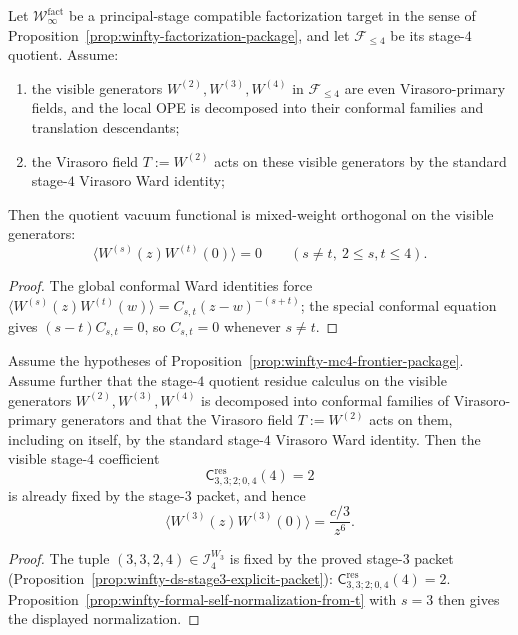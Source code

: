 \begin{proposition}
\label{prop:winfty-stage4-visible-orthogonality}
Let $\mathcal{W}^{\mathrm{fact}}_\infty$ be a principal-stage
compatible factorization target in the sense of
Proposition~\ref{prop:winfty-factorization-package}, and let
$\mathcal{F}_{\le 4}$ be its stage-$4$ quotient. Assume:
\begin{enumerate}[label=\textup{(\roman*)}]
\item the visible generators $W^{(2)},W^{(3)},W^{(4)}$ in
 $\mathcal{F}_{\le 4}$ are even Virasoro-primary fields, and the local
 OPE is decomposed into their conformal families and translation
 descendants;
\item the Virasoro field $T:=W^{(2)}$ acts on these visible generators
 by the standard stage-$4$ Virasoro Ward identity;
\end{enumerate}
Then the quotient vacuum functional is mixed-weight orthogonal on the
visible generators:
\[
\langle W^{(s)}(z)W^{(t)}(0)\rangle = 0
\qquad (s\neq t,\ 2\le s,t\le 4).
\]
\end{proposition}

\begin{proof}
The global conformal Ward identities force
$\langle W^{(s)}(z)W^{(t)}(w)\rangle = C_{s,t}(z-w)^{-(s+t)}$;
the special conformal equation gives $(s-t)C_{s,t}=0$,
so $C_{s,t}=0$ whenever $s\neq t$.
\end{proof}

\begin{proposition}
\label{prop:winfty-stage4-visible-w3-normalization}
Assume the hypotheses of
Proposition~\ref{prop:winfty-mc4-frontier-package}. Assume further
that the stage-$4$ quotient residue calculus on the visible generators
$W^{(2)},W^{(3)},W^{(4)}$ is decomposed into conformal families of
Virasoro-primary generators and that the Virasoro field $T:=W^{(2)}$
acts on them, including on itself, by the standard stage-$4$
Virasoro Ward identity. Then the visible stage-$4$ coefficient
\[
\mathsf{C}^{\mathrm{res}}_{3,3;2;0,4}(4)=2
\]
is already fixed by the stage-$3$ packet, and hence
\[
\langle W^{(3)}(z)W^{(3)}(0)\rangle=\frac{c/3}{z^{6}}.
\]
\end{proposition}

\begin{proof}
The tuple $(3,3,2,4)\in\mathcal{I}_4^{W_3}$ is fixed by the
proved stage-$3$ packet
(Proposition~\ref{prop:winfty-ds-stage3-explicit-packet}):
$\mathsf{C}^{\mathrm{res}}_{3,3;2;0,4}(4)=2$.
Proposition~\ref{prop:winfty-formal-self-normalization-from-t} with
$s=3$ then gives the displayed normalization.
\end{proof}

